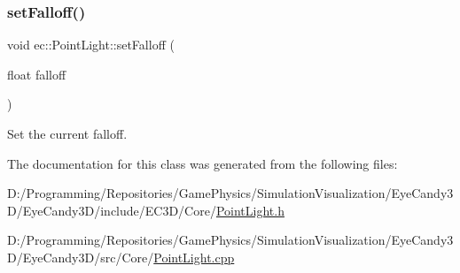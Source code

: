 \mbox{\label{classec_1_1_point_light_a64949f08f93b178b110f9c366d72ce89}} 
\subsubsection{\texorpdfstring{set\+Falloff()}{setFalloff()}}
{\footnotesize\ttfamily void ec\+::\+Point\+Light\+::set\+Falloff (\begin{DoxyParamCaption}\item[{float}]{falloff }\end{DoxyParamCaption})}



Set the current falloff. 



The documentation for this class was generated from the following files\+:\begin{DoxyCompactItemize}
\item 
D\+:/\+Programming/\+Repositories/\+Game\+Physics/\+Simulation\+Visualization/\+Eye\+Candy3\+D/\+Eye\+Candy3\+D/include/\+E\+C3\+D/\+Core/\mbox{\hyperlink{_point_light_8h}{Point\+Light.\+h}}\item 
D\+:/\+Programming/\+Repositories/\+Game\+Physics/\+Simulation\+Visualization/\+Eye\+Candy3\+D/\+Eye\+Candy3\+D/src/\+Core/\mbox{\hyperlink{_point_light_8cpp}{Point\+Light.\+cpp}}\end{DoxyCompactItemize}
